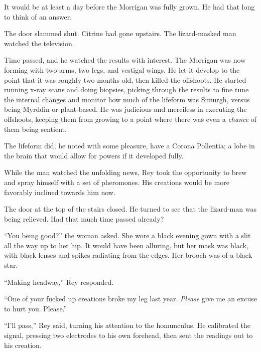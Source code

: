 It would be at least a day before the Morr\'{i}gan was fully grown.  He had that long to think of an answer.



The door slammed shut.  Citrine had gone upstairs.  The lizard-masked man watched the television.



Time passed, and he watched the results with interest. The Morr\'{i}gan was now forming with two arms, two legs, and vestigal wings.  He let it develop to the point that it was roughly two months old, then killed the offshoots.  He started running x-ray scans and doing biopsies, picking through the results to fine tune the internal changes and monitor how much of the lifeform was Simurgh, versus being Myrddin or plant-based.  He was judicious and merciless in executing the offshoots, keeping them from growing to a point where there was even a \emph{chance} of them being sentient.



The lifeform did, he noted with some pleasure, have a Corona Pollentia; a lobe in the brain that would allow for powers if it developed fully.



While the man watched the unfolding news, Rey took the opportunity to brew and spray himself with a set of pheromones.  His creations would be more favorably inclined towards him now.



The door at the top of the stairs closed.  He turned to see that the lizard-man was being relieved.  Had that much time passed already?



``You being good?'' the woman asked.  She wore a black evening gown with a slit all the way up to her hip.  It would have been alluring, but her mask was black, with black lenses and spikes radiating from the edges.  Her brooch was of a black star.



``Making headway,'' Rey responded.



``One of your fucked up creations broke my leg last year.  \emph{Please} give me an excuse to hurt you.  Please.''



``I'll pass,'' Rey said, turning his attention to the homunculus.  He calibrated the signal, pressing two electrodes to his own forehead, then sent the readings out to his creation.



